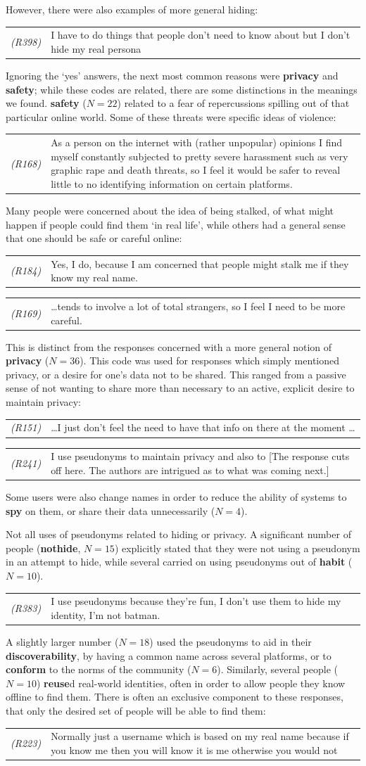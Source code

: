 \documentclass{sig-alternate}
\newcommand{\stag}[1]{\textbf{#1}}
\newcommand{\example}[2]{%

\vspace{0.10cm}

\hspace{-3.9ex} \begin{tabular}{ p{0.6cm} p{7.15cm} }
    {\it \small (R#1)} & #2 \\
\end{tabular}%
\vspace{0.10cm}

}
\begin{document}
However, there were also examples of more general hiding:
\example{398}{I have to do things that people don't need to know about but I don't hide my real persona}

Ignoring the `yes' answers, the next most common reasons were \stag{privacy} and \stag{safety}; while these codes are related, there are some distinctions in the meanings we found. \stag{safety} ($N=22$) related to a fear of repercussions spilling out of that particular online world. Some of these threats were specific ideas of violence:
\example{168}{As a person on the internet with (rather unpopular) opinions I find myself constantly subjected to pretty severe harassment such as very graphic rape and death threats, so I feel it would be safer to reveal little to no  identifying information on certain platforms.}

Many people were concerned about the idea of being stalked, of what might happen if people could find them `in real life', while others had a  general sense that one should be safe or careful online:
\example{184}{Yes, I do, because I am concerned that people might stalk me if they know my real name.}
\example{169}{\ldots tends to involve a lot of total strangers, so I feel I need to be more careful.}

This is distinct from the responses concerned with a more general notion of \stag{privacy} ($N=36$). This code was used for responses which simply mentioned privacy, or a desire for one's data not to be shared. This ranged from a passive sense of not wanting to share more than necessary to
an active, explicit desire to maintain privacy:
\example{151}{\ldots  I just don't feel the need to have that info on there at the moment \ldots}
\example{241}{I use pseudonyms to maintain privacy and also to [The response cuts off here. The authors are intrigued as to what was coming next.]}
Some users were also change names in order to reduce the ability of systems to \stag{spy} on them, or share their data unnecessarily ($N=4$).

Not all uses of pseudonyms related to hiding or privacy. A significant number of people (\stag{nothide}, $N=15$) explicitly stated that they were not using a pseudonym in an attempt to hide, while several carried on using pseudonyms out of \stag{habit} ($N=10$).
\example{383}{I use pseudonyms because they're fun, I don't use them to hide my identity, I'm not batman.}
A slightly larger number ($N=18$) used the pseudonyms to aid in their \stag{discoverability}, by having a common name across several platforms, or to \stag{conform} to the norms of the community ($N=6$).
Similarly, several people ($N=10$) \stag{reuse}d real-world identities, often in order to allow people they know offline to find them. There is often an exclusive component to these responses, that only the desired set of people will be able to find them:
\example{223}{Normally just a username which is based on my real name because if you know me then you will know it is me otherwise you would not}
\end{document}
